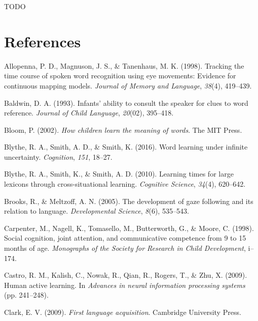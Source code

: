 \documentclass[man,floatsintext]{apa6}
\begin{document}
TODO

\newpage

\section{References}\label{references}

\begingroup
\setlength{\parindent}{-0.5in} \setlength{\leftskip}{0.5in}

\hypertarget{refs}{}
\hypertarget{ref-allopenna1998tracking}{}
Allopenna, P. D., Magnuson, J. S., \& Tanenhaus, M. K. (1998). Tracking
the time course of spoken word recognition using eye movements: Evidence
for continuous mapping models. \emph{Journal of Memory and Language},
\emph{38}(4), 419--439.

\hypertarget{ref-baldwin1993infants}{}
Baldwin, D. A. (1993). Infants' ability to consult the speaker for clues
to word reference. \emph{Journal of Child Language}, \emph{20}(02),
395--418.

\hypertarget{ref-bloom2002children}{}
Bloom, P. (2002). \emph{How children learn the meaning of words}. The
MIT Press.

\hypertarget{ref-blythe2016word}{}
Blythe, R. A., Smith, A. D., \& Smith, K. (2016). Word learning under
infinite uncertainty. \emph{Cognition}, \emph{151}, 18--27.

\hypertarget{ref-blythe2010learning}{}
Blythe, R. A., Smith, K., \& Smith, A. D. (2010). Learning times for
large lexicons through cross-situational learning. \emph{Cognitive
Science}, \emph{34}(4), 620--642.

\hypertarget{ref-brooks2005development}{}
Brooks, R., \& Meltzoff, A. N. (2005). The development of gaze following
and its relation to language. \emph{Developmental Science}, \emph{8}(6),
535--543.

\hypertarget{ref-carpenter1998social}{}
Carpenter, M., Nagell, K., Tomasello, M., Butterworth, G., \& Moore, C.
(1998). Social cognition, joint attention, and communicative competence
from 9 to 15 months of age. \emph{Monographs of the Society for Research
in Child Development}, i--174.

\hypertarget{ref-castro2009human}{}
Castro, R. M., Kalish, C., Nowak, R., Qian, R., Rogers, T., \& Zhu, X.
(2009). Human active learning. In \emph{Advances in neural information
processing systems} (pp. 241--248).

\hypertarget{ref-clark2009first}{}
Clark, E. V. (2009). \emph{First language acquisition}. Cambridge
University Press.
\end{document}

